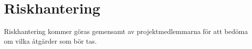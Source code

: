 \section{Riskhantering}
Riskhantering kommer göras gemensamt av projektmedlemmarna för att bedöma om vilka åtgärder som bör tas.